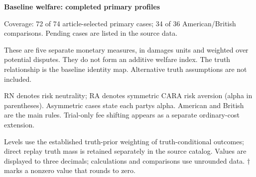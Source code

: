 \documentclass[10pt]{article}
\begin{document}
{\LARGE\bfseries Baseline welfare: completed primary profiles}\par\medskip
Coverage: 72 of 74 article-selected primary cases; 34 of 36 American/British comparisons. Pending cases are listed in the source data.\par\smallskip
These are five separate monetary measures, in damages units and weighted over potential disputes. They do not form an additive welfare index. The truth relationship is the baseline identity map. Alternative truth assumptions are not included.\par\smallskip
RN denotes risk neutrality; RA denotes symmetric CARA risk aversion (alpha in parentheses). Asymmetric cases state each party\textquotesingle s alpha. American and British are the main rules. Trial-only fee shifting appears as a separate ordinary-cost extension.\par\smallskip
Levels use the established truth-prior weighting of truth-conditional outcomes; direct replay truth mass is retained separately in the source catalog. Values are displayed to three decimals; calculations and comparisons use unrounded data. $\dagger$ marks a nonzero value that rounds to zero.\par\medskip
\small\setlength{\tabcolsep}{4pt}
\end{document}
